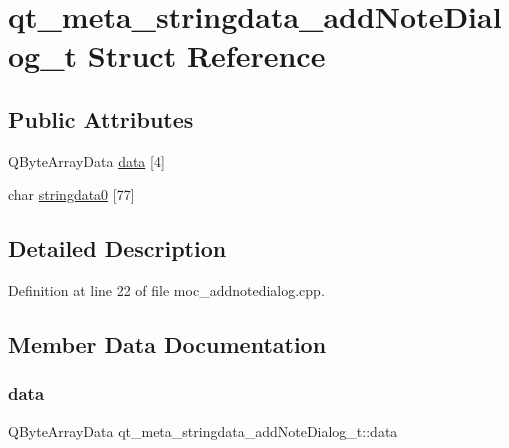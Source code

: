 \hypertarget{structqt__meta__stringdata__addNoteDialog__t}{}\section{qt\+\_\+meta\+\_\+stringdata\+\_\+add\+Note\+Dialog\+\_\+t Struct Reference}
\label{structqt__meta__stringdata__addNoteDialog__t}
\subsection*{Public Attributes}
\begin{DoxyCompactItemize}
\item 
Q\+Byte\+Array\+Data \hyperlink{structqt__meta__stringdata__addNoteDialog__t_a6182404ea668458da8f435aaa45fa4ec}{data} \mbox{[}4\mbox{]}
\item 
char \hyperlink{structqt__meta__stringdata__addNoteDialog__t_aa36bd0528981067f754981fb90d385d8}{stringdata0} \mbox{[}77\mbox{]}
\end{DoxyCompactItemize}


\subsection{Detailed Description}


Definition at line 22 of file moc\+\_\+addnotedialog.\+cpp.



\subsection{Member Data Documentation}
\hypertarget{structqt__meta__stringdata__addNoteDialog__t_a6182404ea668458da8f435aaa45fa4ec}{}\label{structqt__meta__stringdata__addNoteDialog__t_a6182404ea668458da8f435aaa45fa4ec} 
\subsubsection{\texorpdfstring{data}{data}}
{\footnotesize\ttfamily Q\+Byte\+Array\+Data qt\+\_\+meta\+\_\+stringdata\+\_\+add\+Note\+Dialog\+\_\+t\+::data}



